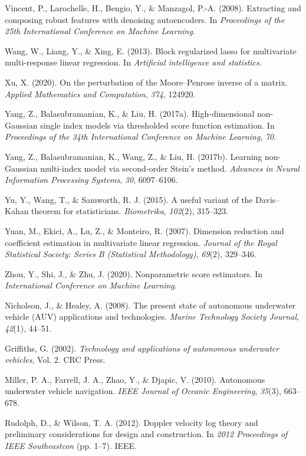 \documentclass{article}
\begin{document}
\begin{thebibliography}{99}
 Vincent, P., Larochelle, H., Bengio, Y., \& Manzagol, P.-A. (2008). Extracting and composing robust features with denoising autoencoders. In \textit{Proceedings of the 25th International Conference on Machine Learning}.

 Wang, W., Liang, Y., \& Xing, E. (2013). Block regularized lasso for multivariate multi-response linear regression. In \textit{Artificial intelligence and statistics}.

 Xu, X. (2020). On the perturbation of the Moore–Penrose inverse of a matrix. \textit{Applied Mathematics and Computation}, \textit{374}, 124920.

 Yang, Z., Balasubramanian, K., \& Liu, H. (2017a). High-dimensional non-Gaussian single index models via thresholded score function estimation. In \textit{Proceedings of the 34th International Conference on Machine Learning}, \textit{70}.

 Yang, Z., Balasubramanian, K., Wang, Z., \& Liu, H. (2017b). Learning non-Gaussian multi-index model via second-order Stein's method. \textit{Advances in Neural Information Processing Systems}, \textit{30}, 6097–6106.

 Yu, Y., Wang, T., \& Samworth, R. J. (2015). A useful variant of the Davis–Kahan theorem for statisticians. \textit{Biometrika}, \textit{102}(2), 315–323.

 Yuan, M., Ekici, A., Lu, Z., \& Monteiro, R. (2007). Dimension reduction and coefficient estimation in multivariate linear regression. \textit{Journal of the Royal Statistical Society: Series B (Statistical Methodology)}, \textit{69}(2), 329–346.

 Zhou, Y., Shi, J., \& Zhu, J. (2020). Nonparametric score estimators. In \textit{International Conference on Machine Learning}.

 Nicholson, J., \& Healey, A. (2008). The present state of autonomous underwater vehicle (AUV) applications and technologies. \textit{Marine Technology Society Journal}, \textit{42}(1), 44–51.

 Griffiths, G. (2002). \textit{Technology and applications of autonomous underwater vehicles}, Vol. 2. CRC Press.

 Miller, P. A., Farrell, J. A., Zhao, Y., \& Djapic, V. (2010). Autonomous underwater vehicle navigation. \textit{IEEE Journal of Oceanic Engineering}, \textit{35}(3), 663–678.

 Rudolph, D., \& Wilson, T. A. (2012). Doppler velocity log theory and preliminary considerations for design and construction. In \textit{2012 Proceedings of IEEE Southeastcon} (pp. 1–7). IEEE.


\end{thebibliography}
\end{document}
